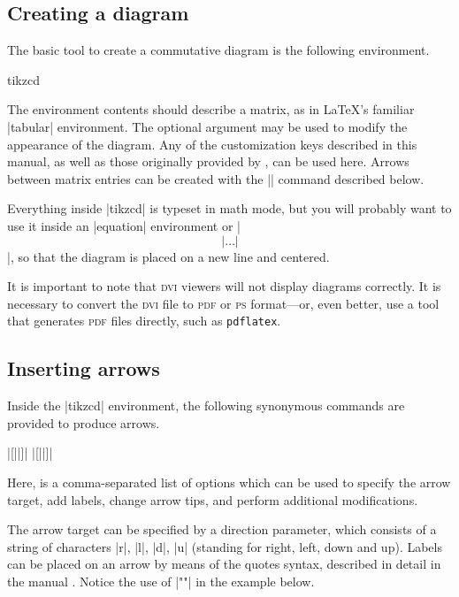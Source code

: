 \documentclass[a4paper]{ltxdoc}
\begin{document}
\subsection{Creating a diagram}
\label{sec:creating-diagrams}

The basic tool to create a commutative diagram is the following
environment.

\begin{environment}{{tikzcd}}
\end{environment}

The environment contents should describe a matrix, as in \LaTeX's
familiar |{tabular}| environment.  The optional argument
 may be used to modify the appearance of the diagram.
Any of the customization keys described in this manual, as well as
those originally provided by \tikzname{}, can be used here.  Arrows
between matrix entries can be created with the |\arrow| command
described below.

Everything inside |{tikzcd}| is typeset in math mode, but you will
probably want to use it inside an |{equation}| environment or
|\[| \dots |\]|,
so that the diagram is placed on a new line and centered.

It is important to note that \textsc{dvi} viewers will not display
diagrams correctly.  It is necessary to convert the \textsc{dvi} file
to \textsc{pdf} or \textsc{ps} format---or, even better, use a tool
that generates \textsc{pdf} files directly, such as \texttt{pdflatex}.

\subsection{Inserting arrows}
\label{sec:inserting-arrows}

Inside the |{tikzcd}| environment, the following synonymous commands
are provided to produce arrows.

\begin{pgfmanualentry}
  \extractcommand\arrow|[||]|\@@
  \extractcommand\ar|[||]|\@@
  \pgfmanualbody
\end{pgfmanualentry}

Here,  is a comma-separated list of options which can be
used to specify the arrow target, add labels, change arrow tips, and
perform additional modifications.

The arrow target can be specified by a direction parameter, which
consists of a string of characters |r|, |l|, |d|, |u| (standing for
right, left, down and up).  Labels can be placed on an arrow by means
of the quotes syntax, described in detail in the \pgfname{} manual
\cite[\S\ref*{pgfman-section-label-quotes}]{pgfman}.  Notice the use
of |"\phi"| in the example below.
\end{document}

